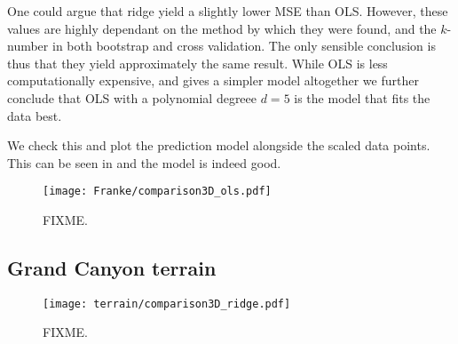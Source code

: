One could argue that ridge yield a slightly lower MSE than OLS. However, these values are highly dependant on the method by which they were found, and the $k$-number in both bootstrap and cross validation. The only sensible conclusion is thus that they yield approximately the same result. While OLS is less computationally expensive, and gives a simpler model altogether we further conclude that OLS with a polynomial degreee $d=5$ is the model that fits the data best. 

We check this and plot the prediction model alongside the scaled data points. This can be seen in  and the model is indeed good. 

\begin{figure}
    \texttt{[image: Franke/comparison3D\_ols.pdf]}
    \caption{FIXME.}
    \label{fig:franke_final_model}
\end{figure}



\subsection{Grand Canyon terrain}

\begin{figure}
    \texttt{[image: terrain/comparison3D\_ridge.pdf]}
    \caption{FIXME.}
    \label{fig:gc_final_model}
\end{figure}
